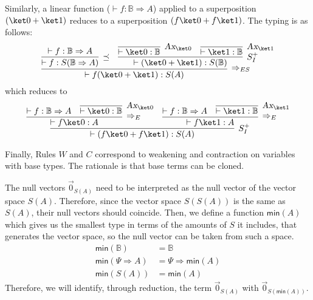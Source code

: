 \documentclass[preprint]{elsarticle}
\newcommand\B{\ensuremath{\mathbb B}}
\newcommand\pair[2]{({#1}+{#2})}
\newcommand\z[1][A]{\vec 0_{S(#1)}}
\newcommand\tax{\textsl{Ax}}
\begin{document}
Similarly, a linear function ($\vdash f:\B\Rightarrow A$) applied to a
superposition $\pair{\ket 0}{\ket 1}$ reduces to a superposition $\pair{f\ket
  0}{f\ket 1}$. The typing is as follows:
\[
  \infer[\Rightarrow_{ES}] {\vdash f\pair{\ket 0}{\ket 1}:S(A)} {
    \infer[\preceq] {\vdash f:S(\B\Rightarrow A)} {\vdash f:\B\Rightarrow A} &
    \infer[S_I^+] {\vdash\pair{\ket 0}{\ket 1}:S(\B)} { \infer[\tax_{\ket
        0}]{\vdash\ket 0:\B}{} & \infer[\tax_{\ket 1}]{\vdash\ket 1:\B}{} } }
\]
which reduces to
\[
  \infer[S_I^+] {\vdash\pair{f\ket 0}{f\ket 1}:S(A)} { \infer[\Rightarrow_E]
    {\vdash f\ket 0:A} { \vdash f:\B\Rightarrow A & \infer[\tax_{\ket 0}]
      {\vdash\ket 0:\B}{} } & \infer[\Rightarrow_E] {\vdash f\ket 1:A} { \vdash
      f:\B\Rightarrow A & \infer[\tax_{\ket 1}] {\vdash\ket 1:\B}{} } }
\]


Finally, Rules $W$ and $C$ correspond to weakening and contraction on variables
with base types. The rationale is that base terms can be cloned.

The null vectors $\z$ need to be interpreted as the null vector of the vector
space $S(A)$. Therefore, since the vector space $S(S(A))$ is the same as $S(A)$,
their null vectors should coincide. Then, we define a function $\mathsf{min}(A)$
which gives us the smallest type in terms of the amounts of $S$ it includes, that generates the vector space, so the null vector can be
taken from such a space.
\begin{align*}
  \mathsf{min}(\B) &= \B\\
  \mathsf{min}(\Psi\Rightarrow A) &=\Psi\Rightarrow\mathsf{min}(A)\\
  \mathsf{min}(S(A)) &=\mathsf{min}(A)
\end{align*}
Therefore, we will identify, through reduction, the term $\z$ with $\z[\mathsf{min}(A)]$.
\end{document}

